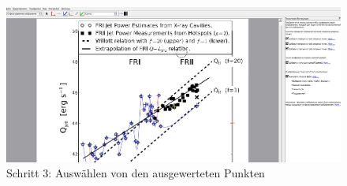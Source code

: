 \documentclass[11pt,
               a4paper,
               parskip=half, style=authoryear, citestyle=authoryear-comp
              bibliography=totoc,
               ]{scrartcl}
\begin{document}
\begin{figure}
    \centering
    \includegraphics[scale=0.35]{shag3.jpg}
    \caption{Schritt 3: Auswählen von den ausgewerteten Punkten}
    \label{fig:my_label}
\end{figure}
\end{document}

